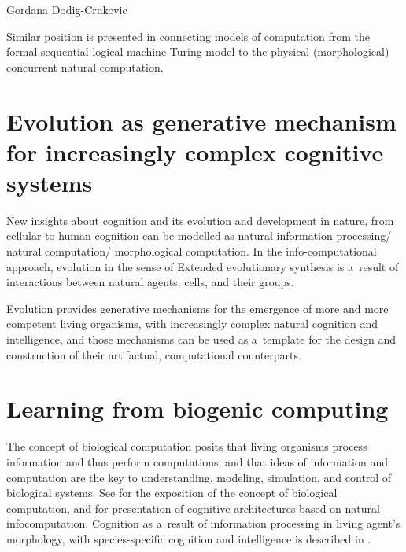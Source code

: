 \begin{artengenv}{Gordana Dodig-Crnkovic}

Similar position is presented in
\parencite{dodig-crnkovic_dialogue_2011}
connecting models of computation from the formal sequential logical machine Turing model to the physical (morphological) concurrent natural computation.

\section*{Evolution as generative mechanism for increasingly complex cognitive systems}
New insights about cognition and its evolution and development in nature, from cellular to human cognition can be modelled as natural information processing/ natural computation/ morphological computation. In the info-computational approach, evolution in the sense of Extended evolutionary synthesis is a~result of interactions between natural agents, cells, and their groups.

Evolution provides generative mechanisms for the emergence of more and more competent living organisms, with increasingly complex natural cognition and intelligence, and those mechanisms can be used as a~template for the design and construction of their artifactual, computational counterparts.

\section*{Learning from biogenic computing}
The concept of biological computation posits that living organisms process information and thus perform computations, and that ideas of information and computation are the key to understanding, modeling, simulation, and control of biological systems. See
\parencite[][]{mitchell_biological_2012} %
 for the exposition of the concept of biological computation, and 
\parencite[][]{dodig-crnkovic_cognitive_2022} %
 for presentation of cognitive architectures based on natural infocomputation. Cognition as a~result of information processing in living agent's morphology, with species-specific cognition and intelligence is described in 
\parencite[][]{dodig-crnkovic_cognition_2021}.%



\end{artengenv}
